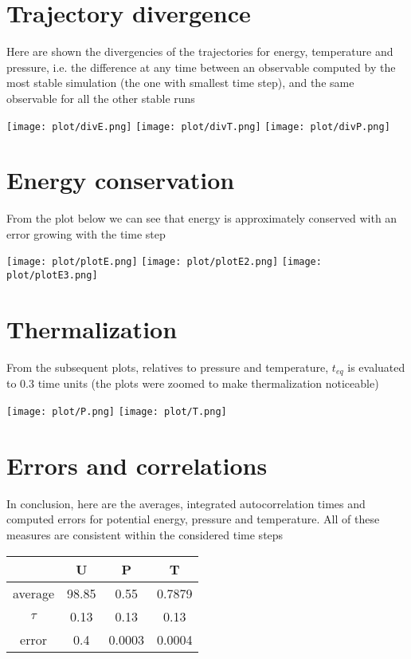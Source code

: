\documentclass{article}
\begin{document}
\section{Trajectory divergence}
Here are shown the divergencies of the trajectories for energy,
temperature and pressure, i.e. the difference at any time between an
observable computed by the most stable simulation (the one with smallest
time step), and the same observable for all the other stable runs

\begin{center}
	\texttt{[image: plot/divE.png]}
	\texttt{[image: plot/divT.png]}
	\texttt{[image: plot/divP.png]}
\end{center}

\section{Energy conservation}
From the plot below we can see that energy is approximately conserved
with an error growing with the time step
\begin{center}
	\texttt{[image: plot/plotE.png]}
	\texttt{[image: plot/plotE2.png]}
	\texttt{[image: plot/plotE3.png]}
\end{center}

\section{Thermalization}
From the subsequent plots, relatives to pressure and temperature,
$t_{eq}$ is evaluated to 0.3 time units (the plots were zoomed to make
thermalization noticeable)
\begin{center}
	\texttt{[image: plot/P.png]}
	\texttt{[image: plot/T.png]}
\end{center}

\section{Errors and correlations}
In conclusion, here are the averages, integrated autocorrelation times
and computed errors for potential energy, pressure and temperature. All
of these measures are consistent within the considered time steps

\begin{center}
\begin{tabular}{c|ccc}
	& U & P & T\\
	\hline
	average & 98.85 & 0.55 &0.7879 \\
	$\tau$ & 0.13 & 0.13 &0.13 \\
	error & 0.4 & 0.0003 &0.0004
\end{tabular}
\end{center}
\end{document}
